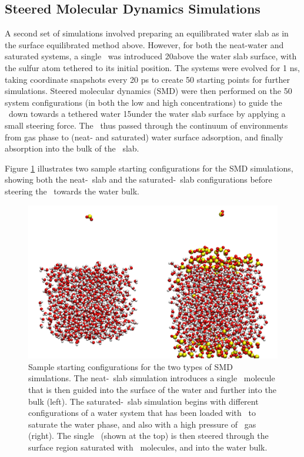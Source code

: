 \subsection{Steered Molecular Dynamics Simulations}

A second set of simulations involved preparing an equilibrated water slab as in the surface equilibrated method above. However, for both the neat-water and saturated systems, a single \suldiox~was introduced 20\angs above the water slab surface, with the sulfur atom tethered to its initial position. The systems were evolved for 1 ns, taking coordinate snapshots every 20 ps to create 50 starting points for further simulations. Steered molecular dynamics (SMD) were then performed on the 50 system configurations (in both the low and high concentrations) to guide the \suldiox~down towards a tethered water 15\angs under the water slab surface by applying a small steering force.\cite{Isralewitz2001} The \suldiox~thus passed through the continuum of environments from gas phase to (neat- and saturated) water surface adsorption, and finally absorption into the bulk of the \wat~slab. 

Figure \ref{fig:starting-configurations} illustrates two sample starting configurations for the SMD simulations, showing both the neat-\wat~slab and the saturated-\wat~slab configurations before steering the \suldiox~towards the water bulk.

\begin{figure}[h!]
	\begin{center}
		\includegraphics[scale=1.0]{images/startingconfigurations.png}
		\caption{Sample starting configurations for the two types of SMD simulations. The neat-\wat~slab simulation introduces a single \suldiox~molecule that is then guided into the surface of the water and further into the bulk (left). The saturated-\wat~slab simulation begins with different configurations of a water system that has been loaded with \suldiox~to saturate the water phase, and also with a high pressure of \suldiox~gas (right). The single \suldiox~(shown at the top) is then steered through the surface region saturated with \suldiox~molecules, and into the water bulk.}
		\label{fig:starting-configurations}
	\end{center}
\end{figure}
